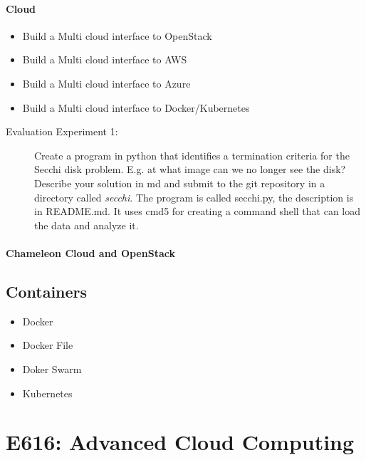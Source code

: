 \begin{itemize}
\subsubsection{Cloud}

\begin{itemize}
\item Build a Multi cloud interface to OpenStack
\item Build a Multi cloud interface to AWS
\item Build a Multi cloud interface to Azure
\item Build a Multi cloud interface to Docker/Kubernetes
\end{itemize}


\begin{description}
\item[Evaluation Experiment 1:] Create a program in python that
  identifies a termination criteria for the Secchi disk
  problem. E.g. at what image can we no longer see the disk?
  Describe your solution in md and submit to the git repository in a
  directory called {\em secchi}. The program is called secchi.py, the
  description is in README.md. It uses cmd5 for creating a command
  shell that can load the data and analyze it. 
\end{description}

\subsubsection{Chameleon Cloud and OpenStack}


\section{Containers}

\begin{itemize}
\item Docker 
\item Docker File
\item Doker Swarm
\item Kubernetes
\end{itemize}

\chapter{E616: Advanced Cloud Computing}


\end{itemize}
